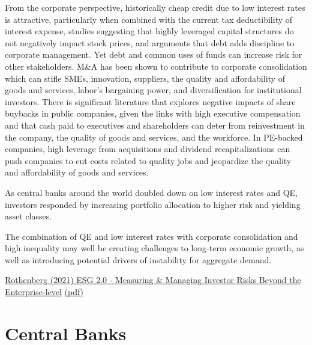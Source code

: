 \documentclass[
]{book}
\begin{document}
From the corporate perspective, historically cheap credit due to low interest rates is attractive,
particularly when combined with the current tax deductibility of interest expense, studies suggesting
that highly leveraged capital structures do not negatively impact stock prices, and arguments that debt
adds discipline to corporate management. Yet debt and common uses of funds can increase risk for
other stakeholders. M\&A has been shown to contribute to corporate consolidation which can stifle
SMEs, innovation, suppliers, the quality and affordability of goods and services, labor's bargaining
power, and diversification for institutional investors. There is significant literature that explores
negative impacts of share buybacks in public companies, given the links with high executive
compensation and that cash paid to executives and shareholders can deter from reinvestment in the
company, the quality of goods and services, and the workforce. In PE-backed companies, high leverage
from acquisitions and dividend recapitalizations can push companies to cut costs related to quality jobs
and jeopardize the quality and affordability of goods and services.

As central banks around the world doubled down on low interest rates and QE, investors responded by
increasing portfolio allocation to higher risk and yielding asset classes.

The combination of QE and low interest rates with corporate consolidation and high
inequality may well be creating challenges to long-term economic growth,
as well as introducing
potential drivers of instability for aggregate demand.

\href{https://papers.ssrn.com/sol3/papers.cfm?abstract_id=3820316}{Rothenberg (2021) ESG 2.0 - Measuring \& Managing Investor Risks Beyond the Enterprise-level}
\href{Rothenberg_2021_ESG2.pdf}{(pdf)}

\hypertarget{central-banks}{%
\section{Central Banks}\label{central-banks}}
\end{document}
